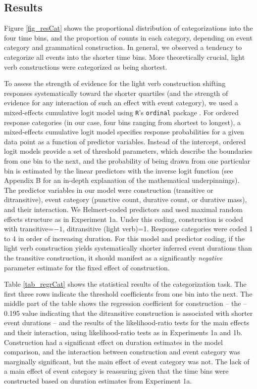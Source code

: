 \documentclass[preprint,12pt,authoryear]{elsarticle}
\begin{document}
\subsection{Results}\label{sec_resCat}

Figure \ref{fig_resCat} shows the proportional distribution of categorizations into the four time bins, and the proportion of counts in each category, depending on event category and grammatical construction. In general, we observed a tendency to categorize all events into the shorter time bins. More theoretically crucial, light verb constructions were categorized as being shortest.

To assess the strength of evidence for the light verb construction shifting responses systematically toward the shorter quartiles (and the strength of evidence for any interaction of such an effect with event category), we used a mixed-effects cumulative logit model using \texttt{R}'s \texttt{ordinal} package \citep{Christensen2015}.  For ordered response categories (in our case, four bins ranging from shortest to longest), a mixed-effects cumulative logit model specifies response probabilities for a given data point as a function of predictor variables. Instead of the intercept, ordered logit models provide a set of threshold parameters, which describe the boundaries from one bin to the next, and the probability of being drawn from one particular bin is estimated by the linear predictors with the inverse logit function (see Appendix B for an in-depth explanation of the mathematical underpinnings). The predictor variables in our model were construction (transitive or ditransitive), event category (punctive count, durative count, or durative mass), and their interaction. We Helmert-coded predictors and used maximal random effects structure as in Experiment 1a.  Under this coding, construction is coded with transitive=$-1$, ditransitive (light verb)=1.  Response categories were coded 1 to 4 in order of increasing duration.  For this model and predictor coding, if the light verb construction yields systematically shorter inferred event durations than the transitive construction, it should manifest as a significantly \emph{negative} parameter estimate for the fixed effect of construction.

Table \ref{tab_regrCat} shows the statistical results of the categorization task. The first three rows indicate the threshold coefficients from one bin into the next. The middle part of the table shows the regression coefficient for construction -- the --0.195 value indicating that the ditransitive construction is associated with shorter event durations -- and the results of the likelihood-ratio tests for the main effects and their interaction, using likelihood-ratio tests as in Experiments 1a and 1b.  Construction had a significant effect on duration estimates in the model comparison, and the interaction between construction and event category was marginally significant, but the main effect of event category was not. The lack of a main effect of event category is reassuring given that the time bins were constructed based on duration estimates from Experiment 1a. 
\end{document}
